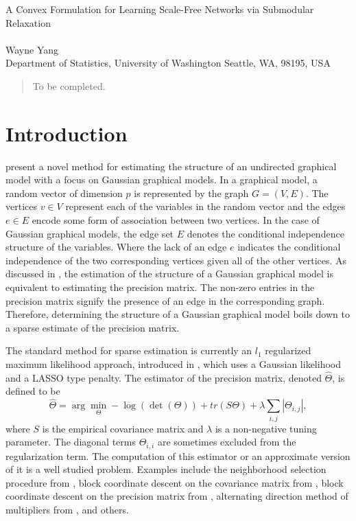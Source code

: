\documentclass{uwstat572}
\theoremstyle{remark}
\theoremstyle{definition}
\begin{document}

\begin{center}
  {\LARGE A Convex Formulation for Learning Scale-Free Networks via Submodular Relaxation}\\\ \\
  {Wayne Yang \\ 
    Department of Statistics, University of Washington Seattle, WA, 98195, USA
  }
\end{center}



\begin{abstract}
  To be completed.
\end{abstract}

\section{Introduction}
\citet{Defazio2012} present a novel method for estimating the structure of an undirected graphical model with a focus on Gaussian graphical models. In a graphical model, a random vector of dimension $p$ is represented by the graph $G = (V,E)$.  The vertices $v \in V$ represent each of the variables in the random vector and the edges $e \in E$ encode some form of association between two vertices. In the case of Gaussian graphical models, the edge set $E$ denotes the conditional independence structure of the variables.  Where the lack of an edge $e$ indicates the conditional independence of the two corresponding vertices given all of the other vertices.  As discussed in \cite{dempster}, the estimation of the structure of a Gaussian graphical model is equivalent to estimating the precision matrix.  The non-zero entries in the precision matrix signify the presence of an edge in the corresponding graph.  Therefore, determining the structure of a Gaussian graphical model boils down to a sparse estimate of the precision matrix.

The standard method for sparse estimation is currently an $l_1$ regularized maximum likelihood approach, introduced in \cite{Yuan2007}, which uses a Gaussian likelihood and a LASSO type penalty.  The estimator of the precision matrix, denoted $\widehat{\Theta}$, is defined to be
\begin{equation}\label{glasso}
    \widehat{\Theta} = \arg\min_{\Theta} -\log( \det( \Theta)) + tr(S \Theta) + \lambda \sum_{i, j} |\Theta_{i,j}|,
\end{equation}
where $S$ is the empirical covariance matrix and $\lambda$ is a non-negative tuning parameter. The diagonal terms $\Theta_{i,i}$ are sometimes excluded from the regularization term. The computation of this estimator or an approximate version of it is a well studied problem.  Examples include the neighborhood selection procedure from \cite{meinshausen2006}, block coordinate descent on the covariance matrix from \cite{Banerjee2008}, block coordinate descent on the precision matrix from \cite{Friedman2008}, alternating direction method of multipliers from \cite{Boyd2011}, and others.
\end{document}
